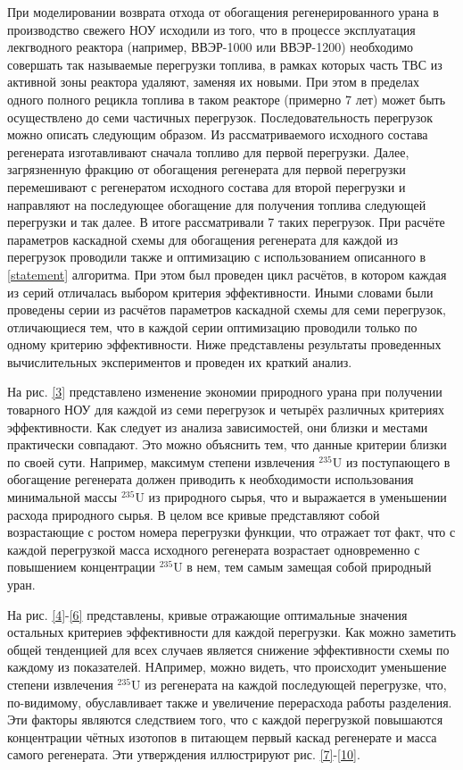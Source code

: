При моделировании возврата отхода от обогащения регенерированного урана в производство свежего НОУ исходили из того, что в процессе эксплуатация лекгводного реактора (например, ВВЭР-1000 или ВВЭР-1200) необходимо совершать так называемые перегрузки топлива, в рамках которых часть ТВС из активной зоны реактора удаляют, заменяя их новыми. При этом в пределах одного полного рецикла топлива в таком реакторе (примерно 7 лет) может быть осуществлено до семи частичных перегрузок. Последовательность перегрузок можно описать следующим образом. Из рассматриваемого исходного состава регенерата изготавливают сначала топливо для первой перегрузки. Далее, загрязненную фракцию от обогащения регенерата для первой перегрузки перемешивают с регенератом исходного состава для второй перегрузки и направляют на последующее обогащение для получения топлива следующей перегрузки и так далее. В итоге рассматривали 7 таких перегрузок. При расчёте параметров каскадной схемы для обогащения регенерата для каждой из перегрузок проводили также и оптимизацию с использованием описанного в \ref{statement} алгоритма. При этом был проведен цикл расчётов, в котором каждая из серий отличалась выбором критерия эффективности. Иными словами были проведены серии из расчётов параметров каскадной схемы для семи перегрузок, отличающиеся тем, что в каждой серии оптимизацию проводили только по одному критерию эффективности. Ниже представлены результаты проведенных вычислительных экспериментов и проведен их краткий анализ.

На рис. \ref{3} представлено изменение экономии природного урана при получении товарного НОУ для каждой из семи перегрузок и четырёх различных критериях эффективности. Как следует из анализа зависимостей, они близки и местами практически совпадают. Это можно объяснить тем, что данные критерии близки по своей сути. Например, максимум степени извлечения $^{235}$U из поступающего в обогащение регенерата должен приводить к необходимости использования минимальной массы $^{235}$U из природного сырья, что и выражается в уменьшении расхода природного сырья. В целом все кривые представляют собой возрастающие с ростом номера перегрузки функции, что отражает тот факт, что с каждой перегрузкой масса исходного регенерата возрастает одновременно с повышением концентрации $^{235}$U в нем, тем самым замещая собой природный уран.

На рис. \ref{4}-\ref{6} представлены, кривые отражающие оптимальные значения остальных критериев эффективности для каждой перегрузки. Как можно заметить общей тенденцией для всех случаев является снижение эффективности схемы по каждому из показателей. НАпример, можно видеть, что происходит уменьшение степени извлечения $^{235}$U из регенерата на каждой последующей перегрузке, что, по-видимому, обуславливает также и увеличение перерасхода работы разделения. Эти факторы являются следствием того, что с каждой перегрузкой повышаются концентрации чётных изотопов в питающем первый каскад регенерате и масса самого регенерата. Эти утверждения иллюстрируют рис. \ref{7}-\ref{10}.   


